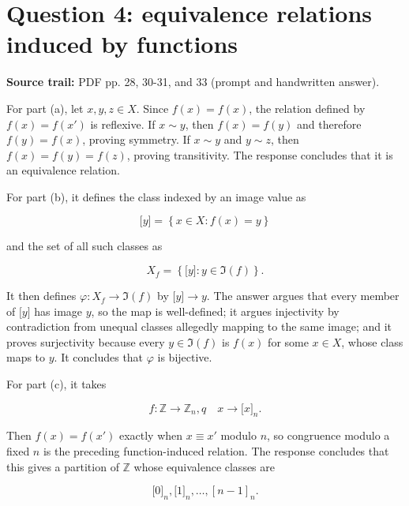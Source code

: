 \section{Question 4: equivalence relations induced by functions}

\textbf{Source trail:} PDF pp. 28, 30-31, and 33 (prompt and handwritten answer).

For part (a), let \(x,y,z \in X\). Since \(f(x) = f(x)\), the relation defined by \(f(x) = f\left( x' \right)\) is reflexive. If \(x \sim y\), then \(f(x) = f(y)\) and therefore \(f(y) = f(x)\), proving symmetry. If \(x \sim y\) and \(y \sim z\), then \(f(x) = f(y) = f(z)\), proving transitivity. The response concludes that it is an equivalence relation.

For part (b), it defines the class indexed by an image value as

\[\lbrack y\rbrack = \left\{ {x \in X:f(x) = y} \right\}\]

and the set of all such classes as

\[X_{f} = \left\{ {\lbrack y\rbrack:y \in \Im(f)} \right\}.\]

It then defines \(\varphi:X_{f}\rightarrow\Im(f)\) by \(\lbrack y\rbrack\rightarrow y\). The answer argues that every member of \(\lbrack y\rbrack\) has image \(y\), so the map is well-defined; it argues injectivity by contradiction from unequal classes allegedly mapping to the same image; and it proves surjectivity because every \(y \in \Im(f)\) is \(f(x)\) for some \(x \in X\), whose class maps to \(y\). It concludes that \(\varphi\) is bijective.

For part (c), it takes

\[f:\mathbb{Z}\rightarrow\mathbb{Z}_{n},q\quad x\rightarrow\lbrack x\rbrack_{n}.\]

Then \(f(x) = f\left( x' \right)\) exactly when \(x \equiv x'\) modulo \(n\), so congruence modulo a fixed \(n\) is the preceding function-induced relation. The response concludes that this gives a partition of \(\mathbb{Z}\) whose equivalence classes are

\[\lbrack 0\rbrack_{n},\lbrack 1\rbrack_{n},\ldots,\left\lbrack {n - 1} \right\rbrack_{n}.\]
